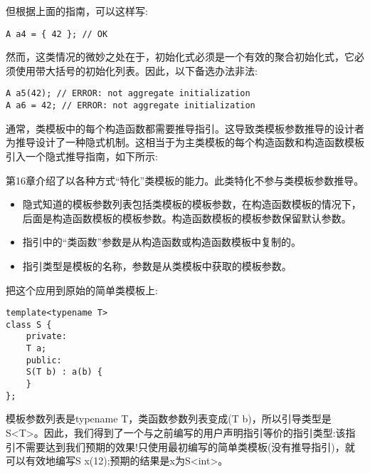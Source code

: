 但根据上面的指南，可以这样写:

\begin{lstlisting}[style=styleCXX]
A a4 = { 42 }; // OK
\end{lstlisting}

然而，这类情况的微妙之处在于，初始化式必须是一个有效的聚合初始化式，它必须使用带大括号的初始化列表。因此，以下备选办法非法:

\begin{lstlisting}[style=styleCXX]
A a5(42); // ERROR: not aggregate initialization
A a6 = 42; // ERROR: not aggregate initialization
\end{lstlisting}


通常，类模板中的每个构造函数都需要推导指引。这导致类模板参数推导的设计者为推导设计了一种隐式机制。这相当于为主类模板的每个构造函数和构造函数模板引入一个隐式推导指南，如下所示:

\begin{tcolorbox}[colback=webgreen!5!white,colframe=webgreen!75!black]
\hspace*{0.75cm}第16章介绍了以各种方式“特化”类模板的能力。此类特化不参与类模板参数推导。
\end{tcolorbox}

\begin{itemize}
\item 
隐式知道的模板参数列表包括类模板的模板参数，在构造函数模板的情况下，后面是构造函数模板的模板参数。构造函数模板的模板参数保留默认参数。

\item 
指引中的“类函数”参数是从构造函数或构造函数模板中复制的。

\item 
指引类型是模板的名称，参数是从类模板中获取的模板参数。
\end{itemize}	

把这个应用到原始的简单类模板上:

\begin{lstlisting}[style=styleCXX]
template<typename T>
class S {
	private:
	T a;
	public:
	S(T b) : a(b) {
	}
};
\end{lstlisting}

模板参数列表是typename T，类函数参数列表变成(T b)，所以引导类型是S<T>。因此，我们得到了一个与之前编写的用户声明指引等价的指引类型:该指引不需要达到我们预期的效果!只使用最初编写的简单类模板(没有推导指引)，就可以有效地编写S x(12);预期的结果是x为S<int>。

